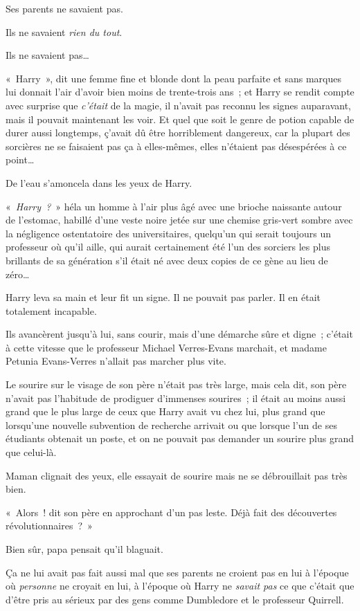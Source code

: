 Ses parents ne savaient pas.

Ils ne savaient \emph{rien du tout}.

Ils ne savaient pas…

«~Harry~», dit une femme fine et blonde dont la peau parfaite et sans marques lui donnait l'air d'avoir bien moins de trente-trois ans~; et Harry se rendit compte avec surprise que \emph{c'était} de la magie, il n'avait pas reconnu les signes auparavant, mais il pouvait maintenant les voir. Et quel que soit le genre de potion capable de durer aussi longtemps, ç'avait dû être horriblement dangereux, car la plupart des sorcières ne se faisaient pas ça à elles-mêmes, elles n'étaient pas désespérées à ce point…

De l'eau s'amoncela dans les yeux de Harry.

«~\emph{Harry~?}~» héla un homme à l'air plus âgé avec une brioche naissante autour de l'estomac, habillé d'une veste noire jetée sur une chemise gris-vert sombre avec la négligence ostentatoire des universitaires, quelqu'un qui serait toujours un professeur où qu'il aille, qui aurait certainement été l'un des sorciers les plus brillants de sa génération s'il était né avec deux copies de ce gène au lieu de zéro…

Harry leva sa main et leur fit un signe. Il ne pouvait pas parler. Il en était totalement incapable.

Ils avancèrent jusqu'à lui, sans courir, mais d'une démarche sûre et digne~; c'était à cette vitesse que le professeur Michael Verres-Evans marchait, et madame Petunia Evans-Verres n'allait pas marcher plus vite.

Le sourire sur le visage de son père n'était pas très large, mais cela dit, son père n'avait pas l'habitude de prodiguer d'immenses sourires~; il était au moins aussi grand que le plus large de ceux que Harry avait vu chez lui, plus grand que lorsqu'une nouvelle subvention de recherche arrivait ou que lorsque l'un de ses étudiants obtenait un poste, et on ne pouvait pas demander un sourire plus grand que celui-là.

Maman clignait des yeux, elle essayait de sourire mais ne se débrouillait pas très bien.

«~Alors~! dit son père en approchant d'un pas leste. Déjà fait des découvertes révolutionnaires~?~»

Bien sûr, papa pensait qu'il blaguait.

Ça ne lui avait pas fait aussi mal que ses parents ne croient pas en lui à l'époque où \emph{personne} ne croyait en lui, à l'époque où Harry ne \emph{savait pas} ce que c'était que d'être pris au sérieux par des gens comme Dumbledore et le professeur Quirrell.

